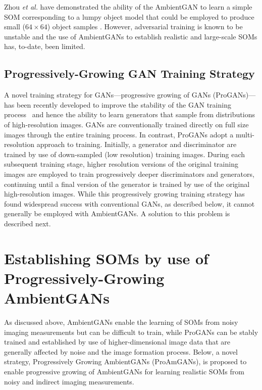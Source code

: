 \documentclass[journal]{IEEEtran}
\begin{document}
Zhou \textit{et al.} have demonstrated the ability of the AmbientGAN to learn a
simple SOM corresponding to a lumpy object model that could be 
employed to produce small ($64\times 64$) object samples \cite{zhou2019learning}.
However,
adversarial training is known to be unstable
and the use of AmbientGANs to establish realistic and large-scale SOMs has, to-date, been limited.


\subsection{Progressively-Growing GAN Training Strategy}
\label{ssec:ProGAN}

A novel training strategy for GANs---progressive growing of GANs (ProGANs)---has been recently developed to improve the stability of the GAN training process~\cite{karras2017progressive} 
and hence the ability to learn  generators that sample
from distributions of high-resolution images.
GANs are conventionally trained directly on full size images through the entire training process.
 In contrast, ProGANs adopt a multi-resolution approach to training.
Initially, a generator and discriminator are trained by use of down-sampled (low resolution) training
images.
During each subsequent training stage, higher resolution versions of the original training images are employed
to train progressively deeper discriminators and generators, continuing until a final version of the
  generator
is trained by use of the original high-resolution images.
While this progressively growing training strategy has found widespread success with conventional GANs,
as described below,
it cannot generally be employed with AmbientGANs.
A solution to this problem is described next.

\section{Establishing SOMs by use of Progressively-Growing AmbientGANs}
\label{sec:ProAmGAN}

As discussed above, AmbientGANs enable the learning of SOMs from noisy imaging measurements but can be difficult to train, 
while ProGANs can be stably trained and established by use of higher-dimensional
image data that are generally affected by noise and the image formation process.
Below, a novel strategy, Progressively Growing AmbientGANs (ProAmGANs), is proposed 
to enable progressive growing of AmbientGANs for  learning
realistic SOMs from noisy and indirect imaging measurements. 
\end{document}
